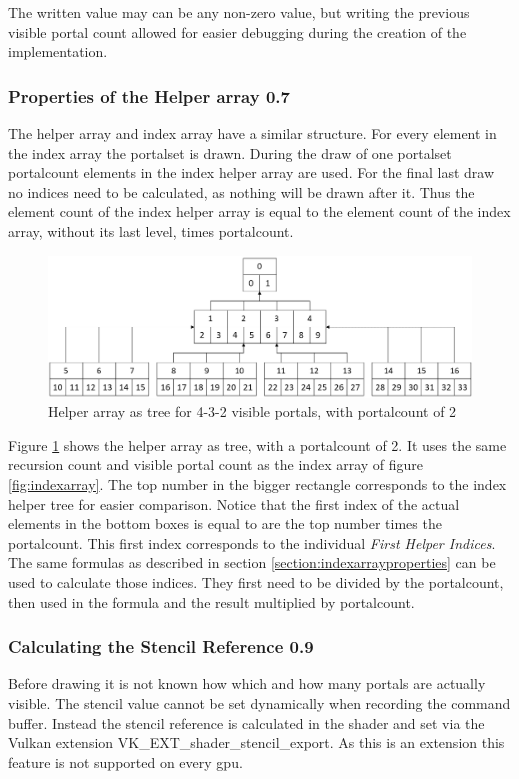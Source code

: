 The written value may can be any non-zero value, but writing the previous visible portal count allowed for easier debugging during the creation of the implementation.

\subsubsection{Properties of the Helper array 0.7}
\label{section:helperarrayproperties}
The helper array and index array have a similar structure. For every element in the index array the \gls{portalset} is drawn. During the draw of one \gls{portalset} \gls{portalcount} elements in the index helper array are used. For the final last draw no indices need to be calculated, as nothing will be drawn after it. Thus the element count of the index helper array is equal to the element count of the index array, without its last level, times \gls{portalcount}.

\begin{figure}[h]
	\includegraphics[width=\linewidth]{images/helperarray.png}
	\caption{Helper array as tree for 4-3-2 visible portals, with \gls{portalcount} of 2}
	\label{fig:helperarray}
\end{figure}

Figure \ref{fig:helperarray} shows the helper array as tree, with a \gls{portalcount} of 2. It uses the same recursion count and visible portal count as the index array of figure \ref{fig:indexarray}. The top number in the bigger rectangle corresponds to the index helper tree for easier comparison. Notice that the first index of the actual elements in the bottom boxes is equal to are the top number times the \gls{portalcount}. This first index corresponds to the individual \textit{First Helper Indices}. The same formulas as described in section \ref{section:indexarrayproperties} can be used to calculate those indices. They first need to be divided by the \gls{portalcount}, then used in the formula and the result multiplied by \gls{portalcount}.


\subsubsection{Calculating the Stencil Reference 0.9}
Before drawing it is not known how which and how many portals are actually visible. The stencil value cannot be set dynamically when recording the command buffer. Instead the stencil reference is calculated in the shader and set via the Vulkan extension VK\_EXT\_shader\_stencil\_export. As this is an extension this feature is not supported on every \gls{gpu}.

